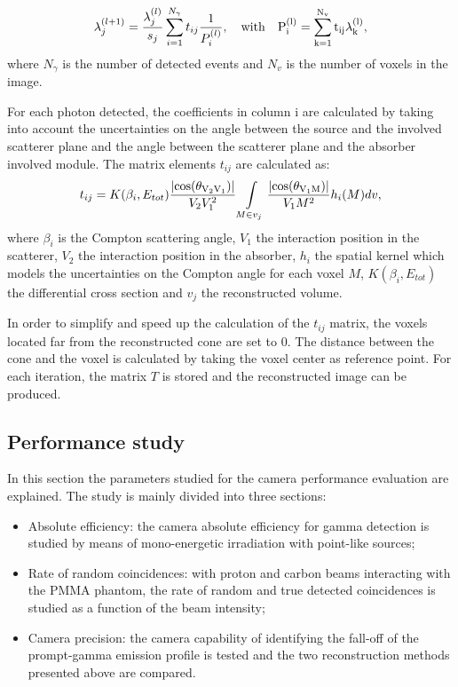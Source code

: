 \begin{equation}
\lambda_j^{(l+1)} =  \frac{\lambda_j^{(l)} }{s_j} \sum\limits_{i=1}^{N_{\gamma}} t_{ij} \frac{1}{P_i^{(l)}},\quad \rm{with}\quad  P_i^{(l)}=\sum\limits_{k=1}^{N_{v}} t_{ij}\lambda_k^{(l)},
 \label{eq:equation_lambda_compton_med_nucleaire}
\end{equation}
where $N_{\gamma}$ is the number of detected events and $N_v$ is the number of voxels in the image.

For each photon detected, the coefficients in column i are calculated by taking into account the uncertainties on the angle between the source and the involved scatterer plane and the angle between the scatterer plane and the absorber involved module.
The matrix elements $t_{ij}$ are calculated as:
\begin{equation}
 t_{ij} = K(\beta_i,E_{tot})\frac{|\rm{cos}(\theta_{{V_2V_1}}) |}{V_2V_1^2} \int\limits_{M\in v_j} \frac{|\rm{cos}(\theta_{V_1M})|}{V_1M^2} h_i(M)dv,
 \label{eq:equation_tij_compton_med_nucleaire}
\end{equation}
where $\beta_i$ is the Compton scattering angle, $V_1$ the interaction position in the scatterer, $V_2$ the interaction position in the absorber, $h_i$ the spatial kernel which models the uncertainties on the Compton angle for each voxel $M$, $K(\beta_i,E_{tot})$ the differential cross section and $v_j$ the reconstructed volume.

In order to simplify and speed up the calculation of the $t_{ij}$ matrix, the voxels located far from the reconstructed cone are set to 0. The distance between the cone and the voxel is calculated by taking the voxel center as reference point. %
For each iteration, the matrix $T$ is stored and the reconstructed image can be produced.


\subsection{Performance study}
\label{MatMeth:performance}
In this section the parameters studied for the camera performance evaluation are explained. The study is mainly divided into three sections:
\begin{itemize}

\item Absolute efficiency: the camera absolute efficiency for gamma detection is studied by means of mono-energetic irradiation with point-like sources;
\item Rate of random coincidences: with proton and carbon beams interacting with the PMMA phantom, the rate of random and true detected coincidences is studied as a function of the beam intensity;
\item Camera precision: the camera capability of identifying the fall-off of the prompt-gamma emission profile is tested and the two reconstruction methods presented above are compared. 

\end{itemize}



